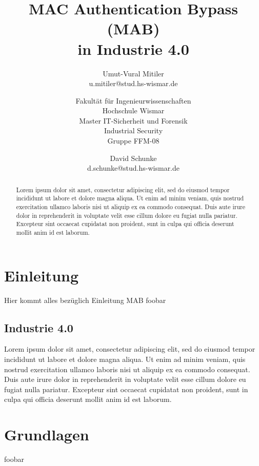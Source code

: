 \documentclass[conference]{IEEEtran}
\begin{document}
\title{MAC Authentication Bypass (MAB)\\ in Industrie 4.0}
\author{
	Umut-Vural Mitiler\\
	u.mitiler@stud.hs-wismar.de
	\and
	Fakultät für Ingenieurwissenschaften\\
	Hochschule Wismar\\
	Master IT-Sicherheit und Forensik\\
	Industrial Security\\
	Gruppe FFM-08
	\and
	David Schunke\\
	d.schunke@stud.hs-wismar.de
}

\maketitle

\begin{abstract}
Lorem ipsum dolor sit amet, consectetur adipiscing elit, sed do eiusmod tempor incididunt ut labore et dolore magna aliqua. Ut enim ad minim veniam, quis nostrud exercitation ullamco laboris nisi ut aliquip ex ea commodo consequat. Duis aute irure dolor in reprehenderit in voluptate velit esse cillum dolore eu fugiat nulla pariatur. Excepteur sint occaecat cupidatat non proident, sunt in culpa qui officia deserunt mollit anim id est laborum.
\end{abstract}

\section{Einleitung}
Hier kommt alles bezüglich Einleitung MAB foobar

\subsection{Industrie 4.0}
Lorem ipsum dolor sit amet, consectetur adipiscing elit, sed do eiusmod tempor incididunt ut labore et dolore magna aliqua. Ut enim ad minim veniam, quis nostrud exercitation ullamco laboris nisi ut aliquip ex ea commodo consequat. Duis aute irure dolor in reprehenderit in voluptate velit esse cillum dolore eu fugiat nulla pariatur. Excepteur sint occaecat cupidatat non proident, sunt in culpa qui officia deserunt mollit anim id est laborum.

\section{Grundlagen}
foobar
\end{document}
